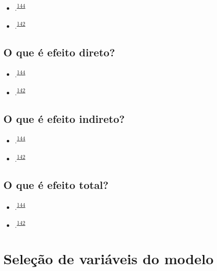 \documentclass[
  a4paper,
]{book}
\begin{document}
\begin{itemize}
\item
  .\textsuperscript{\protect\hyperlink{ref-Baron1986}{144}}
\item
  .\textsuperscript{\protect\hyperlink{ref-Bours2023}{142}}
\end{itemize}

\hypertarget{o-que-uxe9-efeito-direto}{%
\subsection{O que é efeito direto?}\label{o-que-uxe9-efeito-direto}}

\begin{itemize}
\item
  .\textsuperscript{\protect\hyperlink{ref-Baron1986}{144}}
\item
  .\textsuperscript{\protect\hyperlink{ref-Bours2023}{142}}
\end{itemize}

\hypertarget{o-que-uxe9-efeito-indireto}{%
\subsection{O que é efeito indireto?}\label{o-que-uxe9-efeito-indireto}}

\begin{itemize}
\item
  .\textsuperscript{\protect\hyperlink{ref-Baron1986}{144}}
\item
  .\textsuperscript{\protect\hyperlink{ref-Bours2023}{142}}
\end{itemize}

\hypertarget{o-que-uxe9-efeito-total}{%
\subsection{O que é efeito total?}\label{o-que-uxe9-efeito-total}}

\begin{itemize}
\item
  .\textsuperscript{\protect\hyperlink{ref-Baron1986}{144}}
\item
  .\textsuperscript{\protect\hyperlink{ref-Bours2023}{142}}
\end{itemize}

\hypertarget{selecao}{%
\section{Seleção de variáveis do modelo}\label{selecao}}
\end{document}
